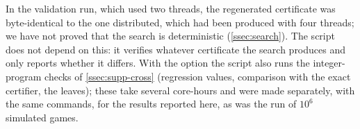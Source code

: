 In the validation run, which used two threads, the regenerated certificate was byte-identical to
the one distributed, which had been produced with four threads; we have not proved that the search is
deterministic (\cref{ssec:search}). The script does not depend on this: it verifies whatever certificate
the search
produces and only reports whether it differs. With the option  the script also runs the
integer-program checks of \cref{ssec:supp-cross} (regression values, comparison with the exact certifier, the
leaves); these take several core-hours and were made separately, with the same commands, for the results
reported here, as was the run of $10^6$ simulated games.
